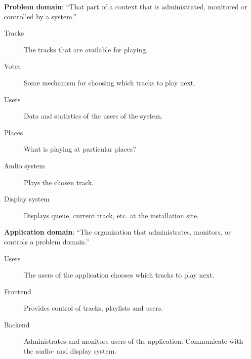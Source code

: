 
\textbf{Problem domain}: \enquote{That part of a context that is administrated, monitored or controlled by a system.}

\begin{description}
  \item[Tracks] The tracks that are available for playing.
  \item[Votes] Some mechanism for choosing which tracks to play next.
  \item[Users] Data and statistics of the users of the system.
  \item[Places] What is playing at particular places?
  \item[Audio system] Plays the chosen track.
  \item[Display system] Displays queue, current track, etc. at the installation site.
\end{description}

\textbf{Application domain}: \enquote{The organization that administrates, monitors, or controls a problem domain.}

\begin{description}
  \item[Users] The users of the application chooses which tracks to play next.
  \item[Frontend] Provides control of tracks, playlists and users.
  \item[Backend] Administrates and monitors users of the application. Communicate with the audio- and display system.
\end{description}
